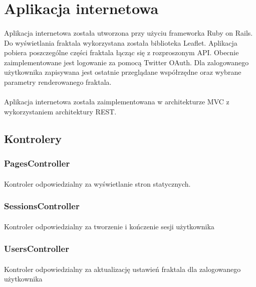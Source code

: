 \documentclass[wide,a4paper,titlepage,12pt]{article}
\begin{document}
\section{Aplikacja internetowa}
\paragraph{}
Aplikacja internetowa została utworzona przy użyciu frameworka Ruby on Rails. Do
wyświetlania fraktala wykorzystana została biblioteka Leaflet. Aplikacja
pobiera poszczególne części fraktala łącząc się z rozproszonym API. Obecnie
zaimplementowane jest logowanie za pomocą Twitter OAuth. Dla zalogowanego
użytkownika zapisywana jest ostatnie przeglądane współrzędne oraz wybrane parametry renderowanego fraktala.

\paragraph{}
Aplikacja internetowa została zaimplementowana w architekturze MVC z wykorzystaniem architektury REST.

\subsection{Kontrolery}
\subsubsection{PagesController}
\paragraph{}
Kontroler odpowiedzialny za wyświetlanie stron statycznych.

\subsubsection{SessionsController}
\paragraph{}
Kontroler odpowiedzialny za tworzenie i kończenie sesji użytkownika

\subsubsection{UsersController}
\paragraph{}
Kontroler odpowiedzialny za aktualizację ustawień fraktala dla zalogowanego użytkownika
\end{document}
